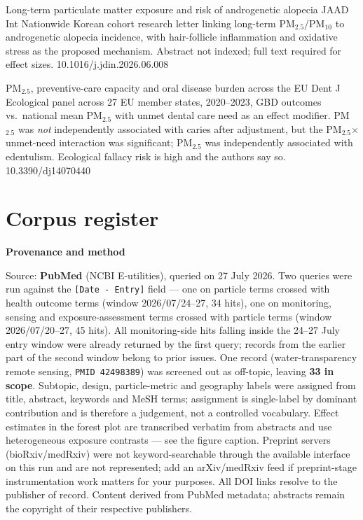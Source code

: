 \documentclass[10pt]{article}
\begin{document}
{Long-term particulate matter exposure and risk of androgenetic alopecia}
{JAAD Int}
{Nationwide Korean cohort research letter linking long-term PM$_{2.5}$/PM$_{10}$ to
androgenetic alopecia incidence, with hair-follicle inflammation and oxidative stress as
the proposed mechanism. Abstract not indexed; full text required for effect sizes.}
{10.1016/j.jdin.2026.06.008}

{PM$_{2.5}$, preventive-care capacity and oral disease burden across the EU}
{Dent J}
{Ecological panel across 27 EU member states, 2020--2023, GBD outcomes vs.\ national mean
PM$_{2.5}$ with unmet dental care need as an effect modifier. PM$_{2.5}$ was \emph{not}
independently associated with caries after adjustment, but the PM$_{2.5}$$\times$unmet-need
interaction was significant; PM$_{2.5}$ was independently associated with edentulism.
Ecological fallacy risk is high and the authors say so.}
{10.3390/dj14070440}

\clearpage

\section*{\sffamily\bfseries\color{Deep}Corpus register}
\vspace{-1.5mm}{\color{Amber}\rule{\linewidth}{1.1pt}}\vspace{2.5mm}



\vspace{4mm}
\begin{keybox}
{\sffamily\bfseries\footnotesize\color{Deep}Provenance and method}\\[1.2mm]
{\fontsize{7.2}{8.8}\selectfont
Source: \textbf{PubMed} (NCBI E-utilities), queried on 27 July 2026. Two queries were run
against the \texttt{[Date - Entry]} field --- one on particle terms crossed with health
outcome terms (window 2026/07/24--27, 34 hits), one on monitoring, sensing and exposure-assessment terms
crossed with particle terms (window 2026/07/20--27, 45 hits). All monitoring-side hits
falling inside the 24--27 July entry window were already returned by the first query;
records from the earlier part of the second window belong to prior issues.
One record (water-transparency remote sensing, \texttt{PMID 42498389}) was screened out
as off-topic, leaving \textbf{33 in scope}.
Subtopic, design, particle-metric and geography labels were assigned from title, abstract,
keywords and MeSH terms; assignment is single-label by dominant contribution and is
therefore a judgement, not a controlled vocabulary.
Effect estimates in the forest plot are transcribed verbatim from abstracts and use
heterogeneous exposure contrasts --- see the figure caption.
Preprint servers (bioRxiv/medRxiv) were not keyword-searchable through the available
interface on this run and are not represented; add an arXiv/medRxiv feed if
preprint-stage instrumentation work matters for your purposes.
All DOI links resolve to the publisher of record. Content derived from PubMed metadata;
abstracts remain the copyright of their respective publishers.\par}
\end{keybox}
\end{document}
